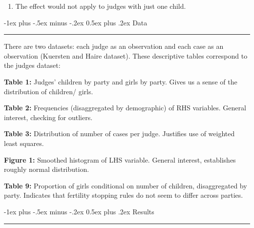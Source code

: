 \documentclass[10pt,landscape]{article}
\makeatletter
\renewcommand{\section}{\@startsection{section}{1}{0mm}%
                                {-1ex plus -.5ex minus -.2ex}%
                                {0.5ex plus .2ex}%
                                {\normalfont\Large\bfseries}}
\makeatother
\begin{document}
\begin{multicols*}{2}
\begin{description}
           \begin{enumerate}
              
              \item The effect would not apply to judges with just one child.
         
           \end{enumerate} 

   \end{description}
    

\section{Data} \smallskip \hrule height 2pt \medskip
There are two datasets: each judge as an observation and each case as an observation (Kuersten and Haire dataset). These descriptive tables correspond to the judges dataset:

   \small 
   \begin{description}
 
        \item \textbf{Table 1:} Judges' children by party and girls by party. Gives us a sense of the distribution of children/ girls.
        
        \item \textbf{Table 2:} Frequencies (disaggregated by demographic) of RHS variables. General interest, checking for outliers.
        
        \item \textbf{Table 3:} Distribution of number of cases per judge. Justifies use of weighted least squares.
       
        \item \textbf{Figure 1:} Smoothed histogram of LHS variable. General interest, establishes roughly normal distribution.
        
        \item \textbf{Table 9:} Proportion of girls conditional on number of children, disaggregated by party. Indicates that fertility stopping rules do not seem to differ across parties.
   
   \end{description}

\section{Results} \smallskip \hrule height 2pt \medskip

   \small
   \begin{itemize}
   

\end{itemize}
\end{multicols*}
\end{document}
